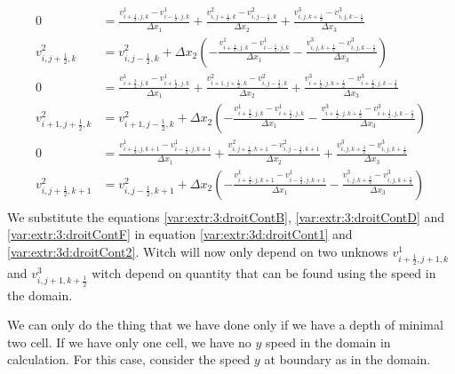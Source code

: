 \begin{align}
\label{var:extr:3:droitContA}
	0&=\frac{v^{1}_{i+\frac{1}{2},j,k}-v^{1}_{i-\frac{1}{2},j,k}}{\Delta x_{1}}+\frac{v^{2}_{i,j+\frac{1}{2},k}-v^{2}_{i,j-\frac{1}{2},k}}{\Delta x_2}+\frac{v^{3}_{i,j,k+\frac{1}{2}}-v^{3}_{i,j,k-\frac{1}{2}}}{\Delta x_{3}}\\
\label{var:extr:3:droitContB}
	v^{2}_{i,j+\frac{1}{2},k}&=v^{2}_{i,j-\frac{1}{2},k}+\Delta x_{2}\left(-\frac{v^{1}_{i+\frac{1}{2},j,k}-v^{1}_{i-\frac{1}{2},j,k}}{\Delta x_{1}}-\frac{v^{3}_{i,j,k+\frac{1}{2}}-v^{3}_{i,j,k-\frac{1}{2}}}{\Delta x_{3}}\right)\\
\label{var:extr:3:droitContC}
	0&=\frac{v^{1}_{i+\frac{3}{2},j,k}-v^{1}_{i+\frac{1}{2},j,k}}{\Delta x_{1}}+\frac{v^{2}_{i+1,j+\frac{1}{2},k}-v^{2}_{i,j-\frac{1}{2},k}}{\Delta x_2}+\frac{v^{3}_{i+\frac{1}{2},j,k+\frac{1}{2}}-v^{3}_{i+\frac{1}{2},j,k-\frac{1}{2}}}{\Delta x_{3}}\\
\label{var:extr:3:droitContD}
	v^{2}_{i+1,j+\frac{1}{2},k}&=v^{2}_{i+1,j-\frac{1}{2},k}+\Delta x_{2}\left(-\frac{v^{1}_{i+\frac{3}{2},j,k}-v^{1}_{i+\frac{1}{2},j,k}}{\Delta x_{1}}-\frac{v^{3}_{i+\frac{1}{2},j,k+\frac{1}{2}}-v^{3}_{i+\frac{1}{2},j,k-\frac{1}{2}}}{\Delta x_{3}}\right)\\
	\label{var:extr:3:droitContE}
	0&=\frac{v^{1}_{i+\frac{1}{2},j,k+1}-v^{1}_{i-\frac{1}{2},j,k+1}}{\Delta x_{1}}+\frac{v^{2}_{i,j+\frac{1}{2},k+1}-v^{2}_{i,j-\frac{1}{2},k+1}}{\Delta x_2}+\frac{v^{3}_{i,j,k+\frac{3}{2}}-v^{3}_{i,j,k+\frac{1}{2}}}{\Delta x_{3}}\\
\label{var:extr:3:droitContF}
	v^{2}_{i,j+\frac{1}{2},k+1}&=v^{2}_{i,j-\frac{1}{2},k+1}+\Delta x_{2}\left(-\frac{v^{1}_{i+\frac{1}{2},j,k+1}-v^{1}_{i-\frac{1}{2},j,k+1}}{\Delta x_{1}}-\frac{v^{3}_{i,j,k+\frac{3}{2}}-v^{3}_{i,j,k+\frac{1}{2}}}{\Delta x_{3}}\right)\\
\end{align}
We substitute the  equations \ref{var:extr:3:droitContB}, \ref{var:extr:3:droitContD} and \ref{var:extr:3:droitContF}  in equation \ref{var:extr:3d:droitCont1} and \ref{var:extr:3d:droitCont2}.
Witch will now only depend on two unknows $v^{1}_{i+\frac{1}{2},j+1,k}$ and $v^{3}_{i,j+1,k+\frac{1}{2}}$ witch depend on quantity that can be found using the speed in the domain.

We can only do the thing that we have done only if we have a depth of minimal two cell.
If we have only one cell, we have no $y$ speed in the domain in calculation.
For this case, consider the speed $y$ at boundary as in the domain.

